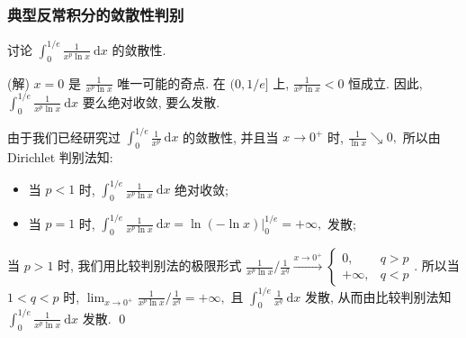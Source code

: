 
\begin{frame}
\frametitle{典型反常积分的敛散性判别}

\begin{eg}
讨论 $\displaystyle \int_0^{1/e} \frac{1}{x^p \ln x} ~ \mathrm{d} x$ 的敛散性.
\end{eg}

\pause
\vspace{0.5em}

\startproof[bg=yellow, fg=red](解)
$x = 0$ 是 $\frac{1}{x^p \ln x}$ 唯一可能的奇点. 在 $(0, 1/e]$ 上, $\frac{1}{x^p \ln x} < 0$ 恒成立. 因此, $\displaystyle \int_0^{1/e} \frac{1}{x^p \ln x} ~ \mathrm{d} x$ 要么绝对收敛, 要么发散.

\pause
\vspace{0.5em}

由于我们已经研究过 $\displaystyle \int_0^{1/e} \frac{1}{x^p} ~ \mathrm{d} x$ 的敛散性, 并且当 $x \to 0^+$ 时, $\frac{1}{\ln x} \searrow 0,$ 所以由 Dirichlet 判别法知:
\begin{itemize}
\item 当 $p < 1$ 时, $\displaystyle \int_0^{1/e} \frac{1}{x^p \ln x} ~ \mathrm{d} x$ 绝对收敛;
\item 当 $p = 1$ 时, $\displaystyle \int_0^{1/e} \frac{1}{x^p \ln x} ~ \mathrm{d} x = \ln(-\ln x) \Big|_0^{1/e} = +\infty,$ 发散;
\end{itemize}
\pause
当 $p > 1$ 时, 我们用比较判别法的极限形式 $\frac{1}{x^p \ln x} \Big/ \frac{1}{x^q} \xrightarrow{x \to 0^+} \begin{cases} 0, & q > p \\ +\infty, & q < p \end{cases}.$ 所以当 $1 < q < p$ 时, $\displaystyle \lim_{x \to 0^+} \frac{1}{x^p \ln x} \Big/ \frac{1}{x^q} = +\infty,$ 且 $\displaystyle \int_0^{1/e} \frac{1}{x^q} ~ \mathrm{d} x$ 发散, 从而由比较判别法知 $\displaystyle \int_0^{1/e} \frac{1}{x^p \ln x} ~ \mathrm{d} x$ 发散.
\qed

\end{frame}




